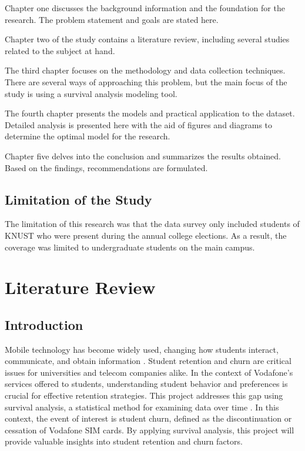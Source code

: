 \documentclass[12pt]{report}
\begin{document}
	Chapter one discusses the background information and the foundation for the research. The problem statement and goals are stated here.
	
	Chapter two of the study contains a literature review, including several studies related to the subject at hand.
	
	The third chapter focuses on the methodology and data collection techniques. There are several ways of approaching this problem, but the main focus of the study is using a survival analysis modeling tool.
	
	The fourth chapter presents the models and practical application to the dataset. Detailed analysis is presented here with the aid of figures and diagrams to determine the optimal model for the research.
	
	Chapter five delves into the conclusion and summarizes the results obtained. Based on the findings, recommendations are formulated.
	
	\section{Limitation of the Study}
	
	The limitation of this research was that the data survey only included students of KNUST who were present during the annual college elections. As a result, the coverage was limited to undergraduate students on the main campus.
	
	\newpage
	\chapter{Literature Review}
	
	
	\section{Introduction}
	Mobile technology has become widely used, changing how students interact, communicate, and obtain information \cite{Alqatani2020}. Student retention and churn are critical issues for universities and telecom companies alike. In the context of Vodafone's services offered to students, understanding student behavior and preferences is crucial for effective retention strategies. This project addresses this gap using survival analysis, a statistical method for examining data over time \cite{BoxSteffensmeier2020}. In this context, the event of interest is student churn, defined as the discontinuation or cessation of Vodafone SIM cards. By applying survival analysis, this project will provide valuable insights into student retention and churn factors.
	
\end{document}
